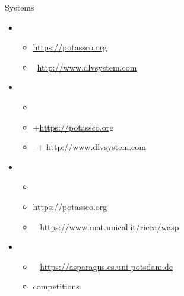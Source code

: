 \begin{frame}{Systems}
  \begin{itemize}
  \item {}
    \begin{itemize}
    \item \alert{\clingo} \cite{gekakasc17a}\hfill \url{https://potassco.org}
    \item \dlv\           \cite{dlv03a,alcadofuleperiveza17a}\hfill \url{http://www.dlvsystem.com}
    \end{itemize}
  \item {}
    \begin{itemize}
    \item \lparse\        \cite{syrjanen01a}                                                     %
    \item \alert{\gringo} \cite{gescth07a,gekaosscth09a}+\cite{gekakosc11a,cafageiakakrlemarisc19a}\hfill\url{https://potassco.org}
    \item \idlv\          \cite{cafupeza17a}+\cite{cafageiakakrlemarisc19a}                        \hfill\url{http://www.dlvsystem.com}
    \end{itemize}
  \item {}
    \begin{itemize}
    \item \smodels\       \cite{niesim96a,siniso02a}              %
    \item \alert{\clasp}  \cite{gekanesc07a,gekasc09c}              \hfill \url{https://potassco.org}
    \item \wasp\          \cite{aldofaleri13a}                      \hfill \url{https://www.mat.unical.it/ricca/wasp}
    \end{itemize}
  \item {}
    \begin{itemize}
    \item \asparagus\     \cite{boansctr04a}                        \hfill \url{https://asparagus.cs.uni-potsdam.de}
    \item competitions \cite{contest07a,contest09a,contest11a,contest13a,cagemari14a}
    \end{itemize}
  \end{itemize}
\end{frame}
%

